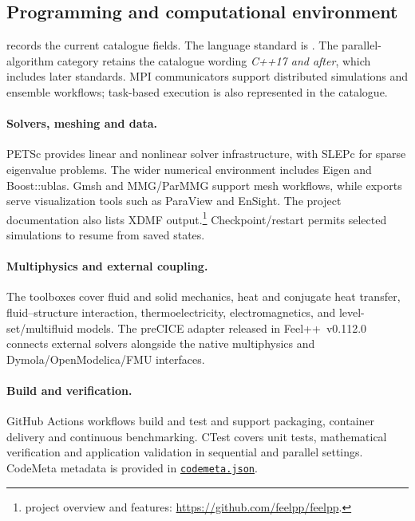 \subsection{Programming and computational environment}
\label{sec::Feelpp:environment_capabilities}
 records the current catalogue fields.
The language standard is . The parallel-algorithm category retains the
catalogue wording \emph{C++17 and after}, which includes later standards.
MPI communicators support distributed simulations and ensemble workflows;
task-based execution is also represented in the catalogue.

\begin{FicheMetadataTable}
  \FrameworkEnvironmentRows
\end{FicheMetadataTable}

\paragraph{Solvers, meshing and data.}
PETSc provides linear and nonlinear solver infrastructure, with SLEPc for
sparse eigenvalue problems. The wider numerical environment includes Eigen and
Boost::ublas. Gmsh and MMG/ParMMG support mesh workflows, while exports serve
visualization tools such as ParaView and EnSight. The project documentation also
lists XDMF output.\footnote{\Feelpp project overview and features:
\url{https://github.com/feelpp/feelpp}.}
Checkpoint/restart permits selected simulations to resume from saved states.

\paragraph{Multiphysics and external coupling.}
The toolboxes cover fluid and solid mechanics, heat and conjugate heat transfer,
fluid--structure interaction, thermoelectricity, electromagnetics, and
level-set/multifluid models. The preCICE adapter released in Feel++~v0.112.0
connects external solvers alongside the native multiphysics and
Dymola/OpenModelica/FMU interfaces.

\paragraph{Build and verification.}
GitHub Actions workflows build and test \Feelpp and support packaging,
container delivery and continuous benchmarking. CTest covers unit tests,
mathematical verification and application validation in sequential and parallel
settings. CodeMeta metadata is provided in
\href{https://github.com/feelpp/feelpp/blob/develop/codemeta.json}{\texttt{codemeta.json}}.

